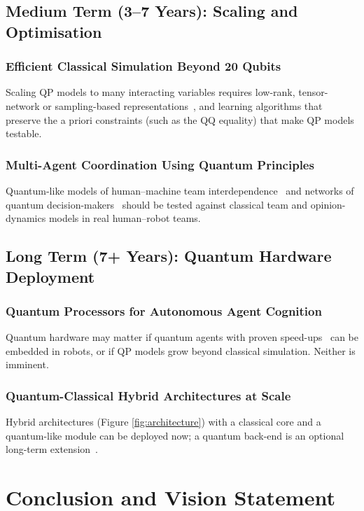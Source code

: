 \documentclass[pdflatex,sn-basic]{sn-jnl}
\begin{document}
\subsection{Medium Term (3--7 Years): Scaling and Optimisation}

\subsubsection{Efficient Classical Simulation Beyond 20 Qubits}
Scaling QP models to many interacting variables requires low-rank, tensor-network or sampling-based representations~\citep{Stoudenmire2016}, and learning algorithms that preserve the a priori constraints (such as the QQ equality) that make QP models testable.

\subsubsection{Multi-Agent Coordination Using Quantum Principles}
Quantum-like models of human--machine team interdependence~\citep{Lawless2023} and networks of quantum decision-makers~\citep{Yukalov2022} should be tested against classical team and opinion-dynamics models in real human--robot teams.

\subsection{Long Term (7+ Years): Quantum Hardware Deployment}

\subsubsection{Quantum Processors for Autonomous Agent Cognition}
Quantum hardware may matter if quantum agents with proven speed-ups~\citep{Paparo2014,Saggio2021} can be embedded in robots, or if QP models grow beyond classical simulation. Neither is imminent.

\subsubsection{Quantum-Classical Hybrid Architectures at Scale}
Hybrid architectures (Figure \ref{fig:architecture}) with a classical core and a quantum-like module can be deployed now; a quantum back-end is an optional long-term extension~\citep{Widdows2023}.


\section{Conclusion and Vision Statement}\label{sec:conclusion}
\end{document}

